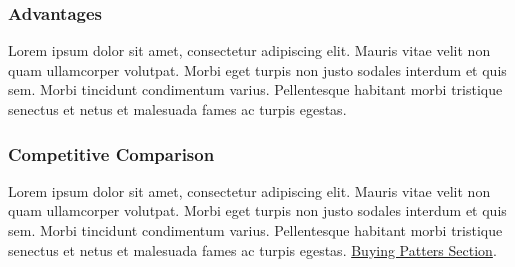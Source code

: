 \documentclass[11pt,titlepage]{article}
\begin{document}
\subsubsection{Advantages}
Lorem ipsum dolor sit amet, consectetur adipiscing elit. Mauris vitae velit 
non quam ullamcorper volutpat. Morbi eget turpis non justo sodales interdum 
et quis sem. Morbi tincidunt condimentum varius. Pellentesque habitant morbi 
tristique senectus et netus et malesuada fames ac turpis egestas.\newline
\subsubsection{Competitive Comparison}
Lorem ipsum dolor sit amet, consectetur adipiscing elit. Mauris vitae velit 
non quam ullamcorper volutpat. Morbi eget turpis non justo sodales interdum 
et quis sem. Morbi tincidunt condimentum varius. Pellentesque habitant morbi 
tristique senectus et netus et malesuada fames ac turpis egestas.\newline
\hyperlink{competition_and_buying_patterns}{Buying Patters Section}.\newline\newline
\end{document}
